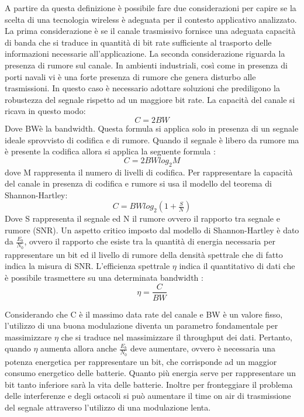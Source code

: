 \documentclass[12pt,a4paper,openright,twoside]{report}
\begin{document}
\normalshape
A partire da questa definizione \`e possibile fare due considerazioni per capire se la scelta di una tecnologia wireless \`e adeguata per il contesto applicativo analizzato.  
La prima considerazione \`e se il canale trasmissivo fornisce una adeguata capacit\`a di banda che si traduce in quantit\`a di bit rate sufficiente al trasporto delle informazioni necessarie all'applicazione. 
La seconda considerazione riguarda la presenza di rumore sul canale. 
In ambienti industriali, cos\`i come in presenza di porti navali vi \`e una forte presenza di rumore che genera disturbo alle trasmissioni. In questo caso \`e necessario adottare soluzioni che prediligono la robustezza del segnale rispetto ad un maggiore bit rate.
La capacit\`a del canale si ricava in questo modo:
\begin{equation*} C = 2BW \end{equation*}
Dove BW\`e la bandwidth. Questa formula si applica solo in presenza di un segnale ideale sprovvisto di codifica e di rumore.
Quando il segnale \`e libero da rumore ma \`e presente la codifica allora si applica la seguente formula :
\begin{equation*} C =2BWlog_2M \end{equation*}
dove M rappresenta il numero di livelli di codifica.
Per rappresentare la capacit\`a del canale in presenza di codifica e rumore si usa il modello del teorema di Shannon-Hartley:
\begin{equation*} C=BWlog_2(1 + \tfrac{S}{N}) \end{equation*}
Dove S rappresenta il segnale ed N il rumore ovvero il rapporto tra segnale e rumore (SNR).
Un aspetto critico imposto dal modello di Shannon-Hartley \`e dato da $\tfrac{E_b}{N_0}$, ovvero il rapporto che esiste tra la quantit\`a di energia necessaria per rappresentare un bit ed il livello di rumore della densit\`a spettrale che di fatto indica la misura di SNR.
L'efficienza spettrale $\eta$ indica il quantitativo di dati che \`e possibile trasmettere su una determinata bandwidth :
\begin{equation*} \eta= \frac{C}{BW} \end{equation*}

Considerando che C \`e il massimo data rate del canale e BW \`e un valore fisso, l'utilizzo di una buona modulazione diventa un parametro fondamentale per massimizzare $\eta$ che si traduce nel massimizzare il throughput dei dati. 
Pertanto, quando $\eta$ aumenta allora anche $\tfrac{E_b}{N_0}$ deve aumentare, ovvero \`e necessaria una potenza energetica per rappresentare un bit, che corrisponde ad un  maggior consumo energetico delle batterie. 
Quanto pi\`u energia serve per rappresentare un bit tanto inferiore sar\`a la vita delle batterie. 
Inoltre per fronteggiare il problema delle interferenze e degli ostacoli si pu\`o aumentare il time on air di trasmissione del segnale attraverso l'utilizzo di una modulazione lenta. 
\end{document}
